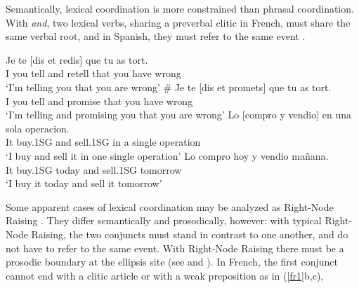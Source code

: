 \documentclass[output=paper
                ,modfonts
                ,nonflat
	        ,collection
	        ,collectionchapter
	        ,collectiontoclongg
 	        ,biblatex
                ,babelshorthands
                ,newtxmath
                ,draftmode
                ,colorlinks, citecolor=brown
]{./langsci/langscibook}
\begin{document}
Semantically, lexical coordination is more constrained than phrasal coordination. With \textit{and}, two lexical verbs, sharing a preverbal clitic in French, must share the same verbal root, and in Spanish, they must refer to the same event \citep{Bosque:86}.

\begin{exe}
 \ex
\begin{xlista}
\ex \gll Je te [dis et redis] que tu as tort. \\
I you tell and retell that you have wrong\\
\glt `I'm telling you that you are wrong'
\ex \gll \# Je te [dis et promets] que tu as tort.\\
I you tell and promise that you have wrong\\
\glt `I'm telling and promising you that you are wrong'
\ex \gll Lo [compro y vendio] en una sola operacion.\\
It buy.1SG and sell.1SG in a single operation\\
\glt `I buy and sell it in one single operation'
\ex \gll *Lo compro hoy y vendio ma\~{n}ana.\\
It buy.1SG today and sell.1SG tomorrow \\
\glt `I buy it today and sell it tomorrow'
\end{xlista}
\end{exe}

Some apparent cases of lexical coordination may be analyzed as Right-Node Raising \citep{Beavers}. They differ semantically and prosodically, however: with typical Right-Node Raising, the two conjuncts must stand in contrast to one another, and do not have to refer to the same event. With Right-Node Raising there must be a prosodic boundary at the ellipsis site (see \citet{chavesrnr} and ). In French, the first conjunct cannot end with a clitic article or with a weak preposition as in (\ref{fr1}b,c),

\begin{exe}
 \ex
\begin{xlista}
\end{xlista}\label{fr1}
\end{exe}
\end{document}
